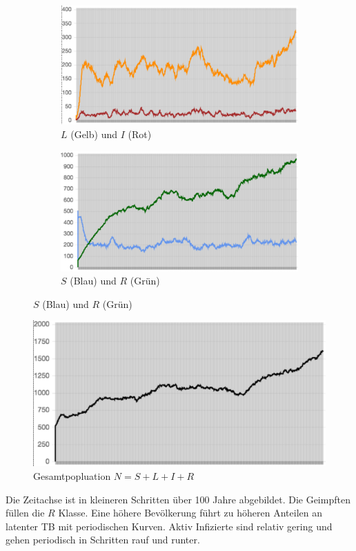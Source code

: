 \documentclass[paper=a4, fontsize=11pt, ngerman, abstract=on]{scrartcl}
\numberwithin{equation}{section} %
\numberwithin{figure}{section} %
\numberwithin{table}{section} %
\begin{document}
\begin{figure}[ht]
\centering
\begin{subfigure}{.45\textwidth}
\centering
\includegraphics[width=.99\linewidth]{images/abm-l-i-exp-1}
\caption{$L$ (Gelb) und $I$ (Rot)}
\label{fig:abm-l-i-exp-1}
\end{subfigure}%
\begin{subfigure}{.45\textwidth}
\centering
\includegraphics[width=.99\linewidth]{images/abm-s-r-exp-1}
\caption{$S$ (Blau) und $R$ (Grün)}
\label{fig:abm-s-r-exp-1}
\end{subfigure}
\end{figure}
\begin{figure}[ht]
\centering
\includegraphics[width=.5\textwidth]{images/abm-n-exp-1}
\caption{Gesamtpopluation $N = S + L + I + R$}
\label{fig:abm-n-exp-1}
\end{figure}

Die Zeitachse ist in kleineren Schritten über 100 Jahre abgebildet. Die Geimpften füllen die $R$ Klasse. Eine höhere Bevölkerung führt zu höheren Anteilen an latenter TB mit periodischen Kurven. Aktiv Infizierte sind relativ gering und gehen periodisch in Schritten rauf und runter.
\end{document}
